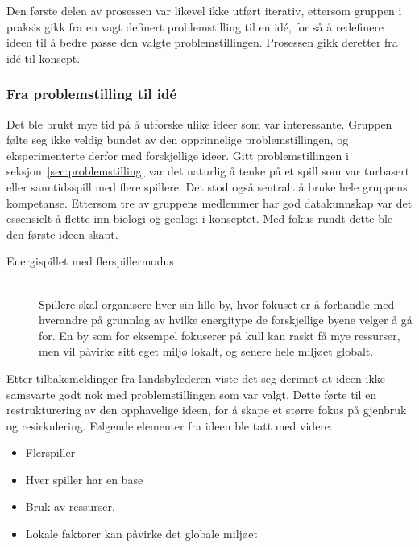 Den første delen av prosessen var likevel ikke utført iterativ, ettersom gruppen i praksis gikk fra en vagt definert problemstilling til en idé, for så å redefinere ideen til å bedre passe den valgte problemstillingen. Prosessen gikk deretter fra idé til konsept.

\subsubsection{Fra problemstilling til idé}
Det ble brukt mye tid på å utforske ulike ideer som var
interessante. Gruppen følte seg ikke veldig bundet av den opprinnelige
problemstillingen, og eksperimenterte derfor med forskjellige ideer.
Gitt problemstillingen i seksjon~\ref{sec:problemstilling} var det
naturlig å tenke på et spill som var turbasert eller sanntidsspill med
flere spillere. Det stod også sentralt å bruke hele gruppens kompetanse. Ettersom tre av gruppens medlemmer har god datakunnskap var det essensielt å flette inn biologi og geologi i konseptet. Med fokus rundt dette ble den første ideen skapt.
\begin{description}
\item[Energispillet med flerspillermodus] \hfill\\
Spillere skal organisere hver sin lille by, hvor fokuset er å forhandle
med hverandre på grunnlag av hvilke energitype de forskjellige byene
velger å gå for. En by som for eksempel fokuserer på kull kan raskt få
mye ressurser, men vil påvirke sitt eget miljø lokalt, og senere hele
miljøet globalt.
\end{description}
Etter tilbakemeldinger fra landsbylederen viste det seg derimot at ideen
ikke samsvarte godt nok med problemstillingen som var valgt. Dette førte
til en restrukturering av den opphavelige ideen, for å skape et større fokus på
gjenbruk og resirkulering. Følgende elementer fra ideen ble tatt med
videre:
\begin{itemize}
	\item Flerspiller
	\item Hver spiller har en base
	\item Bruk av ressurser. 
	\item Lokale faktorer kan påvirke det globale miljøet
\end{itemize}
